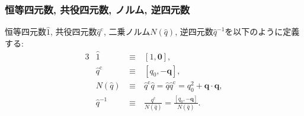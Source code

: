 \subsubsection{恒等四元数, 共役四元数, ノルム, 逆四元数}
恒等四元数$\hat{1}$, 共役四元数$\hat{q}^{\mathrm{c}}$, 二乗ノルム$N(\hat{q})$, 逆四元数$\hat{q}^{-1}$を以下のように定義する:
\begin{alignat}{3}
&\hat{1} &~\equiv~& [1, \mathbf{0}],
 \\
& \hat{q}^{\mathrm{c}} &~\equiv~& [q_{0}, -\mathbf{q}],
 \\
&N(\hat{q}) &~\equiv~& \hat{q}^{\mathrm{c}} \hat{q} 
            = \hat{q} \hat{q}^{\mathrm{c}} = q_{0}^{2} + \mathbf{q} \cdot \mathbf{q},
 \\
&\hat{q}^{-1} &~\equiv~& \frac{q^{\mathrm{c}}}{N(\hat{q})} 
              = \frac{[q_{0}, - \mathbf{q}]}{N(\hat{q})}.
\end{alignat}


